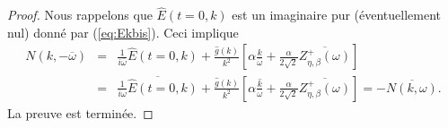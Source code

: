 \begin{proof}
Nous rappelons que $\hat{E}(t=0,k)$ est un imaginaire pur (éventuellement nul) donné par (\ref{eq:Ekbis}). Ceci implique
\begin{eqnarray*}
N(k,-\overline{\omega})&=&\frac{1}{i\overline{\omega}}\hat{E}(t=0,k)+\frac{\hat{g}(k)}{ k^2}\left[\alpha\frac{k}{\overline{\omega}}+\frac{\alpha}{2\sqrt{2}}\overline{Z_{\eta,\beta}^+\left(\omega\right)}\right]\\
&=&\overline{\frac{1}{i\omega}\hat{E}(t=0,k)}+\frac{\hat{g}(k)}{ k^2}\left[\alpha\overline{\frac{k}{\omega}}+\frac{\alpha}{2\sqrt{2}}\overline{Z_{\eta,\beta}^+\left(\omega\right)}\right]=-\overline{N(k,\omega)}.
\end{eqnarray*}
La preuve est terminée.
\end{proof}
